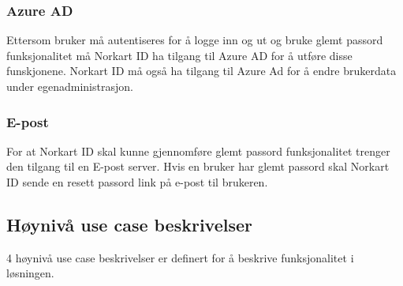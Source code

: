 \subsubsection*{Azure AD}
Ettersom bruker må autentiseres for å logge inn og ut og bruke glemt passord funksjonalitet  må Norkart ID ha tilgang til Azure AD for å utføre disse funskjonene. Norkart ID må også ha tilgang til Azure Ad for å endre brukerdata under egenadministrasjon.

\subsubsection* {E-post}
For at Norkart ID skal kunne gjennomføre glemt passord funksjonalitet trenger den tilgang til en E-post server. Hvis en bruker har glemt passord skal Norkart ID sende en resett passord link på e-post til brukeren.

\subsection{Høynivå use case beskrivelser}
\label{subsec:kravspesifikasjonGammel_funksjonelleKrav_hoyNivaa}
4 høynivå use case beskrivelser er definert for å beskrive funksjonalitet i løsningen.

